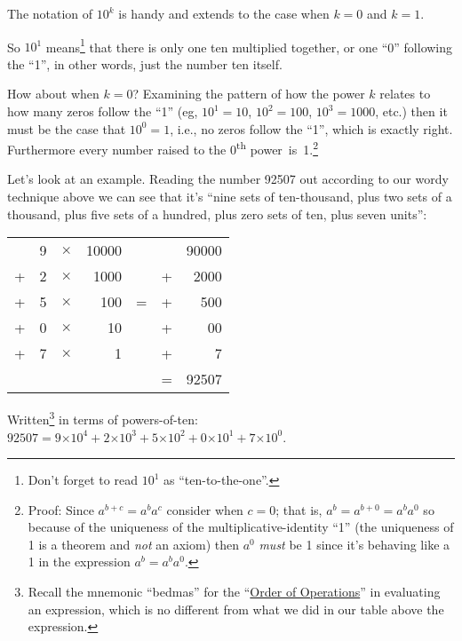 \documentclass{article}
\begin{document}
The notation of $10^k$ is handy and extends
to the case when $k=0$ and $k=1$.

So $10^1$ means\footnote{Don't forget to read $10^1$
as ``ten-to-the-one''.} that there is only one ten multiplied together,
or one ``0'' following the ``1'',
in other words, just the number ten itself.

\break
How about when $k=0$?
Examining the pattern of how the power $k$ relates to how many zeros follow the ``1''
(eg, $10^1=10$, $10^2=100$, $10^3=1000$,
etc.) then it must be the case that $10^0=1$,
i.e., no zeros follow the ``1'', which is exactly right.
Furthermore every number raised to the 0\textsuperscript{th}
power~is~1.\footnote{Proof: Since $a^{b+c}=a^ba^c$ consider when $c=0$; that is,
$a^b=a^{b+0}=a^ba^0$ so because of the uniqueness
of the multiplicative-identity ``1'' (the uniqueness of 1
is a theorem and \emph{not} an axiom) then $a^0$ \emph{must} be 1 since it's behaving 
like a 1 in the expression $a^b=a^ba^0$.}

Let's look at an example.
Reading the number 92507 out according to our wordy technique above we can see
that it's ``nine sets of ten-thousand,
plus two sets of a thousand, plus five sets of a hundred,
plus zero sets of ten, plus seven units'':

\begin{center}
\begin{tabular}{r r r r c r r}
\phantom & 9 & $\times$ & 10000 & \phantom & \phantom & 90000\\
+ & 2 & $\times$ & 1000 & \phantom & + & 2000\\
+ & 5 & $\times$ & 100 & \; \; \; = \; \; \; & + & 500\\
+ & 0 & $\times$ & 10 & \phantom & + & 00\\
+ & 7 & $\times$ & 1 & \phantom & + & 7\\
\cline{6-7}
\phantom & \phantom & \phantom & \phantom & \phantom & = & 92507
\end{tabular}
\end{center}

Written\footnote{Recall the mnemonic ``bedmas'' for
the ``\href{https://en.wikipedia.org/wiki/Order_of_operations}{Order of Operations}'' in
evaluating an expression, which is no different from
what we did in our table above the expression.}
in terms of powers-of-ten:
$92507=9{\times{}}10^4+2{\times{}}10^3+5{\times{}}10^2+0{\times{}}10^1+7{\times{}}10^0$.
\end{document}
